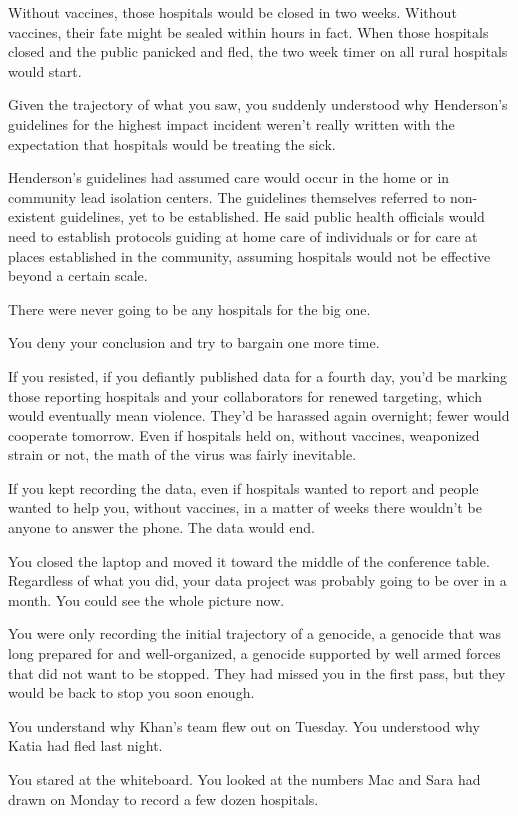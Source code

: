 \documentclass[17pt, twoside, a5paper, openright, extrafontsizes]{memoir}
\begin{document}
Without vaccines, those hospitals would be closed in two weeks. Without
vaccines, their fate might be sealed within hours in fact. When those
hospitals closed and the public panicked and fled, the two week timer on
all rural hospitals would start.

Given the trajectory of what you saw, you suddenly understood why
Henderson's guidelines for the highest impact incident weren't really
written with the expectation that hospitals would be treating the sick.

Henderson's guidelines had assumed care would occur in the home or in
community lead isolation centers. The guidelines themselves referred to
non-existent guidelines, yet to be established. He said public health
officials would need to establish protocols guiding at home care of
individuals or for care at places established in the community, assuming
hospitals would not be effective beyond a certain scale.

There were never going to be any hospitals for the big one.

You deny your conclusion and try to bargain one more time.

If you resisted, if you defiantly published data for a fourth day, you'd
be marking those reporting hospitals and your collaborators for renewed
targeting, which would eventually mean violence. They'd be harassed
again overnight; fewer would cooperate tomorrow. Even if hospitals held
on, without vaccines, weaponized strain or not, the math of the virus
was fairly inevitable.

If you kept recording the data, even if hospitals wanted to report and
people wanted to help you, without vaccines, in a matter of weeks there
wouldn't be anyone to answer the phone. The data would end.

You closed the laptop and moved it toward the middle of the conference
table. Regardless of what you did, your data project was probably going
to be over in a month. You could see the whole picture now.

You were only recording the initial trajectory of a genocide, a genocide
that was long prepared for and well-organized, a genocide supported by
well armed forces that did not want to be stopped. They had missed you
in the first pass, but they would be back to stop you soon enough.

You understand why Khan's team flew out on Tuesday. You understood why
Katia had fled last night.

You stared at the whiteboard. You looked at the numbers Mac and Sara had
drawn on Monday to record a few dozen hospitals.
\end{document}
